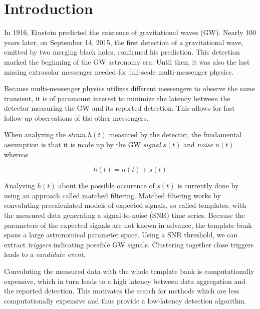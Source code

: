 
\section{Introduction}
In 1916, Einstein predicted the existence of gravitational waves (GW). Nearly
100 years later, on September 14, 2015, the first detection of a gravitational
wave\cite{PhysRevLett.116.061102}, emitted by two merging black holes, confirmed
his prediction. This detection marked the beginning of the GW astronomy era.
Until then, it was also the last missing extrasolar messenger needed for 
full-scale multi-messenger physics.
\cite{Branchesi_2016} 

Because multi-messenger physics utilizes different messengers to observe the 
same transient, it is of paramount interest to minimize the latency between 
the detector measuring the GW and its reported detection. This allows for
fast follow-up observations of the other messengers.

When analyzing the \textit{strain} $h(t)$ measured by the detector, the
fundamental assumption is that it is made up by the GW \textit{signal} $s(t)$
and \textit{noise} $n(t)$ whereas

\begin{equation}
  h(t) = n(t) + s(t)
\end{equation}

Analyzing $h(t)$ about the possible occurence of $s(t)$ is currently done by
using an approach called matched filtering. Matched filtering works by 
convoluting precalculated models of expected signals, so called templates, with
the measured data generating a signal-to-noise (SNR) time series. Because the
parameters of the expected signals are not known in advance, the template bank
spans a large astronomical parameter space.
Using a SNR threshold, we can extract \textit{triggers} indicating possible GW 
signals. Clustering together close triggers leads to a \textit{candidate event}.

Convoluting the measured data with the whole template bank is computationally
expensive, which in turn leads to a high latency between data aggregation and
the reported detection. This motivates the search for methods which are less
computationally expensive and thus provide a low-latency detection algorithm.

